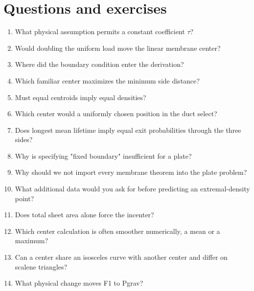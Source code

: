 \documentclass[11pt,oneside,openany]{book}
\begin{document}
\section*{Questions and exercises}

\begin{enumerate}

\item\label{ex:32} What physical assumption permits a constant coefficient \ensuremath{\tau}?

\item\label{ex:33} Would doubling the uniform load move the linear membrane center?

\item\label{ex:34} Where did the boundary condition enter the derivation?

\item\label{ex:35} Which familiar center maximizes the minimum side distance?

\item\label{ex:36} Must equal centroids imply equal densities?

\item\label{ex:37} Which center would a uniformly chosen position in the duct select?

\item\label{ex:38} Does longest mean lifetime imply equal exit probabilities through the three sides?

\item\label{ex:39} Why is specifying "fixed boundary" insufficient for a plate?

\item\label{ex:40} Why should we not import every membrane theorem into the plate problem?

\item\label{ex:41} What additional data would you ask for before predicting an extremal-density point?

\item\label{ex:42} Does total sheet area alone force the incenter?

\item\label{ex:43} Which center calculation is often smoother numerically, a mean or a maximum?

\item\label{ex:44} Can a center share an isosceles curve with another center and differ on scalene triangles?

\item\label{ex:45} What physical change moves F1 to Pgrav?

\end{enumerate}
\end{document}
